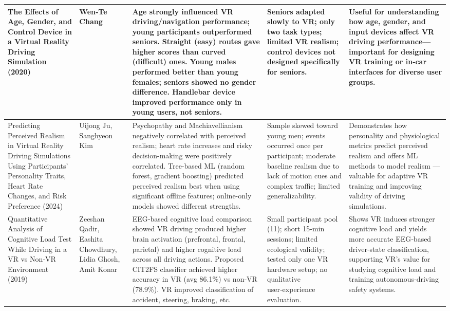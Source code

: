 {\begin{longtable}{|p{}|p{}|>{\raggedright\arraybackslash}p{}|>{\raggedright\arraybackslash}p{}|>{\raggedright\arraybackslash}p{}|}
The Effects of Age, Gender, and Control Device in a Virtual Reality Driving Simulation (2020)~\cite{Chang2020} & Wen‑Te Chang & Age strongly influenced VR driving/navigation performance; young participants outperformed seniors. Straight (easy) routes gave higher scores than curved (difficult) ones. Young males performed better than young females; seniors showed no gender difference. Handlebar device improved performance only in young users, not seniors. & Seniors adapted slowly to VR; only two task types; limited VR realism; control devices not designed specifically for seniors. & Useful for understanding how age, gender, and input devices affect VR driving performance—important for designing VR training or in‑car interfaces for diverse user groups. \\ \hline
Predicting Perceived Realism in Virtual Reality Driving Simulations Using Participants’ Personality Traits, Heart Rate Changes, and Risk Preference (2024) & Uijong Ju, Sanghyeon Kim & Psychopathy and Machiavellianism negatively correlated with perceived realism; heart rate increases and risky decision-making were positively correlated. Tree-based ML (random forest, gradient boosting) predicted perceived realism best when using significant offline features; online-only models showed different strengths. & Sample skewed toward young men; events occurred once per participant; moderate baseline realism due to lack of motion cues and complex traffic; limited generalizability. & Demonstrates how personality and physiological metrics predict perceived realism and offers ML methods to model realism — valuable for adaptive VR training and improving validity of driving simulations. \\ \hline
Quantitative Analysis of Cognitive Load Test While Driving in a VR vs Non‑VR Environment (2019)~\cite{Qadir2019} & Zeeshan Qadir, Eashita Chowdhury, Lidia Ghosh, Amit Konar & EEG‑based cognitive load comparison showed VR driving produced higher brain activation (prefrontal, frontal, parietal) and higher cognitive load across all driving actions. Proposed CIT2FS classifier achieved higher accuracy in VR (avg 86.1\%) vs non‑VR (78.9\%). VR improved classification of accident, steering, braking, etc. & Small participant pool (11); short 15‑min sessions; limited ecological validity; tested only one VR hardware setup; no qualitative user‑experience evaluation. & Shows VR induces stronger cognitive load and yields more accurate EEG‑based driver‑state classification, supporting VR’s value for studying cognitive load and training autonomous‑driving safety systems. \\ \hline

\end{longtable}}
